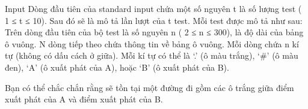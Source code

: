 Input
Dòng đầu tiên của standard input chứa một số nguyên t là số lượng test ( 1 ≤ t ≤ 10). Sau đó sẽ là mô tả lần lượt của t test. Mỗi test được mô tả như sau: Trên dòng đầu tiên của bộ test là số nguyên n ( 2 ≤ n ≤ 300), là độ dài của bảng ô vuông. N dòng tiếp theo chứa thông tin về bảng ô vuông. Mỗi dòng chứa n kí tự (không có dấu cách ở giữa). Mỗi kí tự có thể là ‘.’ (ô màu trắng), ‘\#’ (ô màu đen), ‘A’ (ô xuất phát của A), hoặc ‘B’ (ô xuất phát của B).  

   Bạn có thể chắc chắn rằng sẽ tồn tại một đường đi gồm các ô trắng giữa điểm xuất phát của A và điểm xuất phát của B.